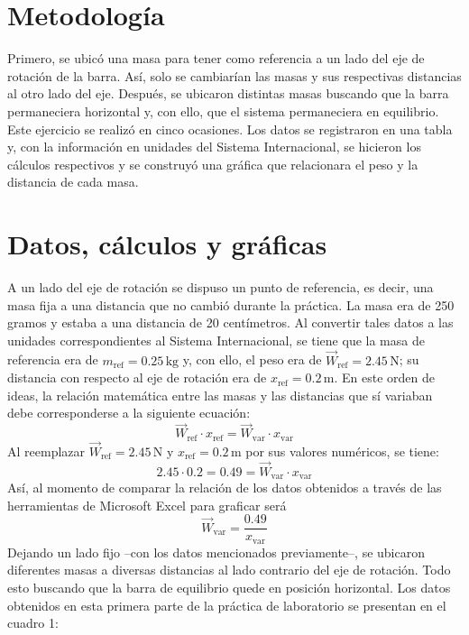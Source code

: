 \documentclass{article}
\begin{document}
\section*{Metodología}
Primero, se ubicó una masa para tener como referencia a un lado del eje de rotación de la barra. Así, solo se cambiarían las masas y sus respectivas distancias al otro lado del eje. Después, se ubicaron distintas masas buscando que la barra permaneciera horizontal y, con ello, que el sistema permaneciera en equilibrio. Este ejercicio se realizó en cinco ocasiones. Los datos se registraron en una tabla y, con la información en unidades del Sistema Internacional, se hicieron los cálculos respectivos y se construyó una gráfica que relacionara el peso y la distancia de cada masa. 


\section*{Datos, cálculos y gráficas}
A un lado del eje de rotación se dispuso un punto de referencia, es decir, una masa fija a una distancia que no cambió durante la práctica. La masa era de 250 gramos y estaba a una distancia de 20 centímetros. Al convertir tales datos a las unidades correspondientes al Sistema Internacional, se tiene que la masa de referencia era de \( m_{\text{ref}} = 0.25 \, \text{kg} \) y, con ello, el peso era de \( \vec{W}_{\text{ref}} = 2.45 \, \text{N} \); su distancia con respecto al eje de rotación era de \( x_{\text{ref}} = 0.2 \, \text{m} \). En este orden de ideas, la relación matemática entre las masas y las distancias que sí variaban debe corresponderse a la siguiente ecuación:
\[
\vec{W}_{\text{ref}} \cdot x_{\text{ref}} = \vec{W}_{\text{var}} \cdot x_{\text{var}}
\]
Al reemplazar \( \vec{W}_{\text{ref}} = 2.45 \, \text{N} \) y \( x_{\text{ref}} = 0.2 \, \text{m} \) por sus valores numéricos, se tiene:
\[
2.45 \cdot 0.2 = 0.49 = \vec{W}_{\text{var}} \cdot x_{\text{var}}
\]
Así, al momento de comparar la relación de los datos obtenidos a través de las herramientas de Microsoft Excel para graficar será 
\[
\vec{W}_{\text{var}} = \frac{0.49}{x_{\text{var}}}
\]
Dejando un lado fijo –con los datos mencionados previamente–, se ubicaron diferentes masas a diversas distancias al lado contrario del eje de rotación. Todo esto buscando que la barra de equilibrio quede en posición horizontal. Los datos obtenidos en esta primera parte de la práctica de laboratorio se presentan en el cuadro 1:

\bigskip
\end{document}
